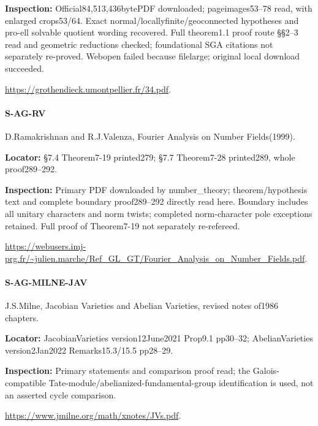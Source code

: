 \documentclass[11pt,a4paper]{article}
\begin{document}
\textbf{Inspection:} Official84,513,436bytePDF downloaded; pageimages53–\allowbreak{}78 read, with enlarged crops53/\allowbreak{}64.\allowbreak{} Exact normal/\allowbreak{}locallyfinite/\allowbreak{}geoconnected hypotheses and pro-ell solvable quotient wording recovered.\allowbreak{} Full theorem1.\allowbreak{}1 proof route §§2–\allowbreak{}3 read and geometric reductions checked; foundational SGA citations not separately re-proved.\allowbreak{} Webopen failed because filelarge; original local download succeeded.\allowbreak{}

\url{https://grothendieck.umontpellier.fr/34.pdf}.

\paragraph{S-AG-RV} D.\allowbreak{}Ramakrishnan and R.\allowbreak{}J.\allowbreak{}Valenza, Fourier Analysis on Number Fields(1999).

\textbf{Locator:} §7.\allowbreak{}4 Theorem7-19 printed279; §7.\allowbreak{}7 Theorem7-28 printed289, whole proof289–\allowbreak{}292.

\textbf{Inspection:} Primary PDF downloaded by number\_\allowbreak{}theory; theorem/\allowbreak{}hypothesis text and complete boundary proof289–\allowbreak{}292 directly read here.\allowbreak{} Boundary includes all unitary characters and norm twists; completed norm-character pole exceptions retained.\allowbreak{} Full proof of Theorem7-19 not separately re-refereed.\allowbreak{}

\url{https://webusers.imj-prg.fr/~julien.marche/Ref_GL_GT/Fourier_Analysis_on_Number_Fields.pdf}.

\paragraph{S-AG-MILNE-JAV} J.\allowbreak{}S.\allowbreak{}Milne, Jacobian Varieties and Abelian Varieties, revised notes of1986 chapters.

\textbf{Locator:} JacobianVarieties version12June2021 Prop9.\allowbreak{}1 pp30–\allowbreak{}32; AbelianVarieties version2Jan2022 Remarks15.\allowbreak{}3/\allowbreak{}15.\allowbreak{}5 pp28–\allowbreak{}29.

\textbf{Inspection:} Primary statements and comparison proof read; the Galois-compatible Tate-module/\allowbreak{}abelianized-fundamental-group identification is used, not an asserted cycle comparison.\allowbreak{}

\url{https://www.jmilne.org/math/xnotes/JVs.pdf}.
\end{document}
